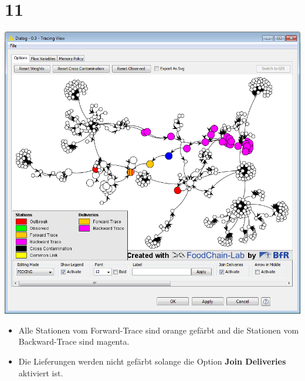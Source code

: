 \documentclass{beamer}
\begin{document}
\section{11}
\begin{frame}
	\begin{center}
  		\includegraphics[height=0.6\textheight]{11.png}
	\end{center}
	\begin{itemize}
		\item Alle Stationen vom Forward-Trace sind orange gefärbt and die Stationen vom Backward-Trace sind magenta.
		\item Die Lieferungen werden nicht gefärbt solange die Option \textbf{Join Deliveries} aktiviert ist.
	\end{itemize}
\end{frame}
\end{document}
